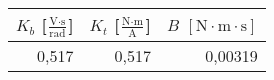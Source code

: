 \begin{tabular}{r|r|r}
$K_b$ [$\frac{\text{V} \cdot \text{s}}{\text{rad}}$]&$K_t$ [$\frac{\text{N} \cdot \text{m}}{\text{A}}$]&$B$ $[\text{N} \cdot \text{m} \cdot \text{s}]$\\\hline
0,517&0,517&0,00319\\
\end{tabular}
